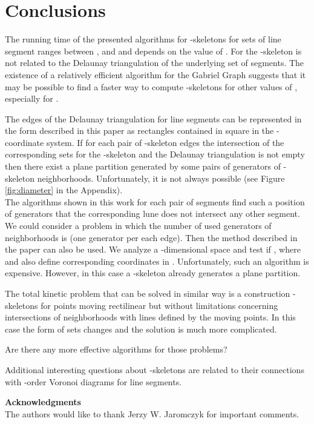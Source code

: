 \documentclass[11pt]{llncs}
\begin{document}
 
\section{Conclusions}

The running time of the presented algorithms for -skeletons for sets 
of  line segment ranges between ,  
and  and depends on the value of .  
For  the -skeleton 
is not related to the Delaunay triangulation of the underlying set of segments.
The existence of a relatively efficient algorithm for the Gabriel Graph 
suggests that it may be possible to find a faster way 
to compute -skeletons for other values of , especially 
for .

 The edges of the Delaunay triangulation for line segments can be represented 
in the form described in this paper as rectangles contained in 
square in the -coordinate system.
If for each pair of -skeleton edges the intersection of the corresponding
sets for the -skeleton and the Delaunay triangulation is not empty then
there exist a plane partition generated by some pairs of generators of -skeleton
neighborhoods. Unfortunately, it is not always possible (see Figure \ref{fig:diameter} in the Appendix).\\
The algorithms shown in this work for each pair of segments find such a position 
of generators that the corresponding lune does not intersect any other segment. 
We could consider a problem in which the number of used generators of neighborhoods is  (one generator per each edge). Then the method described in the paper can also be used. 
We analyze a -dimensional space and test if 
, where  and  also define corresponding coordinates 
in . Unfortunately, such an algorithm is expensive. 
 However, in this case a -skeleton already generates a plane partition.

 The total kinetic problem that can be solved in similar way is a construction 
-skeletons for points moving rectilinear but without limitations concerning 
intersections of neighborhoods with lines defined by the moving points. In this case the form of sets 
 changes and the solution is much more complicated.

 Are there any more effective algorithms for those problems? 

Additional interesting questions about -skeletons are related 
to their connections with -order Voronoi diagrams for line segments.  




\noindent
{\bf Acknowledgments}\\
\noindent
The authors would like to thank Jerzy W. Jaromczyk for important comments.
\end{document}
